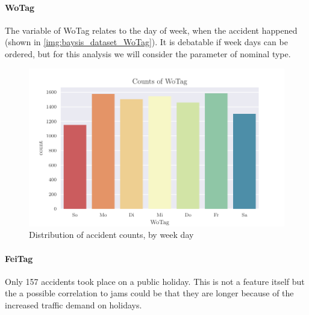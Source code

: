 \paragraph{WoTag}
The variable of WoTag relates to the day of week, when the accident happened (shown in \autoref{img:baysis_dataset_WoTag}). It is debatable if week days can be ordered, but for this analysis we will consider the parameter of nominal type.
\begin{figure}[ht]
	\centering
	\includegraphics[scale=0.75]{CorrAnalysis/data/BAYSIS/01_dataset/plots/baysis_dataset_count_WoTag}
	\caption{Distribution of accident counts, by week day}
	\label{img:baysis_dataset_WoTag}
	\vspace{-8mm}
\end{figure}

\paragraph{FeiTag}
Only 157 accidents took place on a public holiday. This is not a feature itself but the a possible correlation to jams could be that they are longer because of the increased traffic demand on holidays.
	

